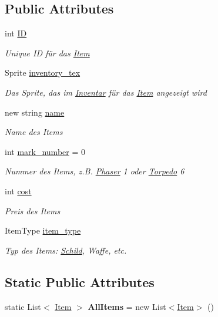 \subsection*{Public Attributes}
\begin{DoxyCompactItemize}
\item 
int \hyperlink{class_item_a9bb8b7d4f5a5a3242136bd49eb2833da}{ID}
\begin{DoxyCompactList}\small\item\em Unique ID für das \hyperlink{class_item}{Item} \end{DoxyCompactList}\item 
Sprite \hyperlink{class_item_a7306d611989cda78275f2c097553b1c1}{inventory\+\_\+tex}
\begin{DoxyCompactList}\small\item\em Das Sprite, das im \hyperlink{class_inventar}{Inventar} für das \hyperlink{class_item}{Item} angezeigt wird \end{DoxyCompactList}\item 
new string \hyperlink{class_item_ad853c3926372e263a546f9a411ef5323}{name}
\begin{DoxyCompactList}\small\item\em Name des Items \end{DoxyCompactList}\item 
int \hyperlink{class_item_a32ee9b922a1369a8fd6447198a987331}{mark\+\_\+number} = 0
\begin{DoxyCompactList}\small\item\em Nummer des Items, z.\+B. \hyperlink{class_phaser}{Phaser} 1 oder \hyperlink{class_torpedo}{Torpedo} 6 \end{DoxyCompactList}\item 
int \hyperlink{class_item_a3be388595e4069403ed40296fe9a104a}{cost}
\begin{DoxyCompactList}\small\item\em Preis des Items \end{DoxyCompactList}\item 
Item\+Type \hyperlink{class_item_a6bb9d607aa6d88c13e82c37e9da08e73}{item\+\_\+type}
\begin{DoxyCompactList}\small\item\em Typ des Items\+: \hyperlink{class_schild}{Schild}, Waffe, etc. \end{DoxyCompactList}\end{DoxyCompactItemize}
\subsection*{Static Public Attributes}
\begin{DoxyCompactItemize}
\item 
\mbox{\label{class_item_a123b132e4d6dfc056b81fe5358fe3e0e}} 
static List$<$ \hyperlink{class_item}{Item} $>$ {\bfseries All\+Items} = new List$<$\hyperlink{class_item}{Item}$>$ ()
\end{DoxyCompactItemize}


